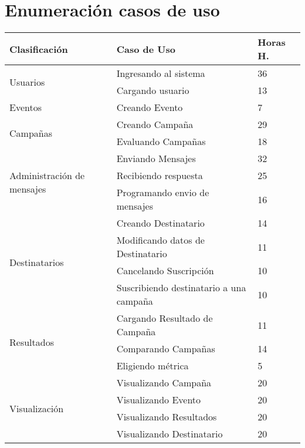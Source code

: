 \documentclass[a4paper, 11pt]{article}
\begin{document}
\newpage
\section{Enumeraci\'on casos de uso}


\begin{table}[H]
\centering
\begin{tabular}{ | p{5cm} | p{8cm} | p{1.5cm} | }
\hline
Clasificación & Caso de Uso & Horas H.\\ \hline \hline
\multirow{2}{5cm}{Usuarios} & Ingresando al sistema & 36 \\ \cline{2-3}
& Cargando usuario & 13 \\ \hline
Eventos & Creando Evento & 7 \\ \hline
\multirow{2}{5cm}{Campañas} & Creando Campaña & 29 \\ \cline{2-3}
& Evaluando Campañas & 18 \\ \hline
\multirow{3}{5cm}{Administración de mensajes} & Enviando Mensajes & 32 \\ \cline{2-3}
& Recibiendo respuesta & 25 \\ \cline{2-3}
& Programando envio de mensajes & 16 \\ \hline
\multirow{4}{5cm}{Destinatarios} & Creando Destinatario & 14 \\  \cline{2-3}
& Modificando datos de Destinatario & 11 \\ \cline{2-3}
& Cancelando Suscripci\'on & 10 \\ \cline{2-3}
& Suscribiendo destinatario a una campaña & 10 \\ \hline
\multirow{3}{5cm}{Resultados} & Cargando Resultado de Campaña & 11 \\ \cline{2-3}
& Comparando Campañas & 14 \\ \cline{2-3}
& Eligiendo métrica & 5 \\ \hline
\multirow{4}{5cm}{Visualización} & Visualizando Campaña & 20 \\ \cline{2-3}
& Visualizando Evento & 20 \\ \cline{2-3}
& Visualizando Resultados & 20 \\ \cline{2-3}
& Visualizando Destinatario & 20 \\ \hline

\end{tabular}
\end{table}
\end{document}
